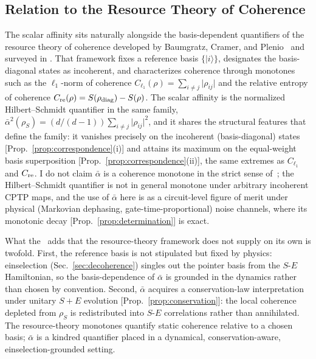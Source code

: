 \subsection{Relation to the Resource Theory of Coherence}
\label{subsec:rtoc}

The scalar affinity sits naturally alongside the basis-dependent
quantifiers of the resource theory of coherence developed by
Baumgratz, Cramer, and Plenio~\cite{Baumgratz2014} and surveyed in
\cite{Streltsov2017Review}.
That framework fixes a reference basis $\{\vert i\rangle\}$, designates
the basis-diagonal states as incoherent, and characterizes coherence
through monotones such as the
$\ell_1$-norm of coherence
$C_{\ell_1}(\rho) = \sum_{i\neq j}\lvert\rho_{ij}\rvert$ and the
relative entropy of coherence
$C_{\rm re}(\rho) = S(\rho_{\rm diag}) - S(\rho)$.
The scalar affinity is the normalized Hilbert--Schmidt quantifier in the
same family,
$\bar\alpha^2(\rho_S) = (d/(d-1))\sum_{i\neq j}\lvert\rho_{ij}\rvert^2$,
and it shares the structural features that define the family: it
vanishes precisely on the incoherent (basis-diagonal) states
[Prop.~\ref{prop:correspondence}(i)] and attains its maximum on the
equal-weight basis superposition [Prop.~\ref{prop:correspondence}(ii)],
the same extremes as $C_{\ell_1}$ and $C_{\rm re}$.
I do not claim $\bar\alpha$ is a coherence monotone in the strict
sense of~\cite{Baumgratz2014}; the Hilbert--Schmidt quantifier is not
in general monotone under arbitrary incoherent CPTP maps, and the
use of $\bar\alpha$ here is as a circuit-level figure of merit
under physical (Markovian dephasing, gate-time-proportional)
noise channels, where its monotonic decay
[Prop.~\ref{prop:determination}] is exact.

What the \RCF~adds that the resource-theory framework does not supply
on its own is twofold.
First, the reference basis is not stipulated but fixed by physics: einselection (Sec.~\ref{sec:decoherence}) singles out the
pointer basis from the $S$-$E$ Hamiltonian, so the basis-dependence of
$\bar\alpha$ is grounded in the dynamics rather than chosen by
convention.
Second, $\bar\alpha$ acquires a conservation-law interpretation under
unitary $S{+}E$ evolution [Prop.~\ref{prop:conservation}]: the local
coherence depleted from $\rho_S$ is redistributed into $S$-$E$
correlations rather than annihilated.
The resource-theory monotones quantify static coherence relative to a
chosen basis; $\bar\alpha$ is a kindred quantifier placed in a
dynamical, conservation-aware, einselection-grounded setting.

